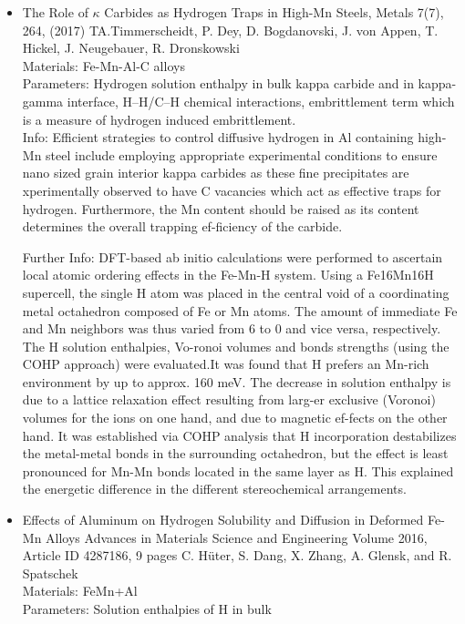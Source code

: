 \documentclass[11pt,floatfix,showpacs]{amsart}
\begin{document}
\begin{itemize}
\item The Role of $\kappa$ Carbides as Hydrogen Traps in High-Mn Steels,
Metals 7(7), 264,  (2017)
TA.Timmerscheidt, P. Dey, D. Bogdanovski, J. von Appen, T. Hickel, J. Neugebauer, R. Dronskowski\\
 Materials: Fe-Mn-Al-C alloys\\
Parameters: Hydrogen solution enthalpy in bulk kappa carbide and in 	kappa-gamma interface, H–H/C–H chemical interactions, embrittlement 	term which is a measure of hydrogen induced embrittlement.\\

Info: Efficient strategies to control diffusive hydrogen in Al containing high-Mn steel include employing appropriate experimental conditions to ensure nano sized grain interior kappa carbides as these fine precipitates are xperimentally observed to have C vacancies which act as effective 	traps for hydrogen. Furthermore, the Mn content should be raised as its 	content determines the overall trapping ef-ficiency of the carbide.

Further Info: DFT-based ab initio calculations were performed to ascertain local atomic ordering effects in the Fe-Mn-H system. Using a Fe16Mn16H supercell, the single H atom was placed in the central void of a coordinating metal octahedron composed of Fe or Mn atoms. The amount of immediate Fe and Mn neighbors was thus varied from 6 to 0 and vice versa, respectively. The H solution enthalpies, Vo-ronoi volumes and bonds strengths (using the COHP approach) were evaluated.It was found that H prefers an Mn-rich environment by up to approx. 160 meV. The decrease in solution enthalpy is due to a lattice relaxation effect resulting from larg-er exclusive (Voronoi) volumes for the ions on one hand, and due to magnetic ef-fects on the other hand. It was established via COHP analysis that H incorporation destabilizes the metal-metal bonds in the surrounding octahedron, but the effect is least pronounced for Mn-Mn bonds located in the same layer as H. This explained the energetic difference in the different stereochemical arrangements.
\item Effects of Aluminum on Hydrogen Solubility and Diffusion in
Deformed Fe-Mn Alloys
Advances in Materials Science and Engineering
Volume 2016, Article ID 4287186, 9 pages
C. H\"uter, S. Dang, X. Zhang, A. Glensk, and R. Spatschek\\
Materials: FeMn+Al\\
Parameters: Solution enthalpies of H in bulk\\


\end{itemize}
\end{document}
